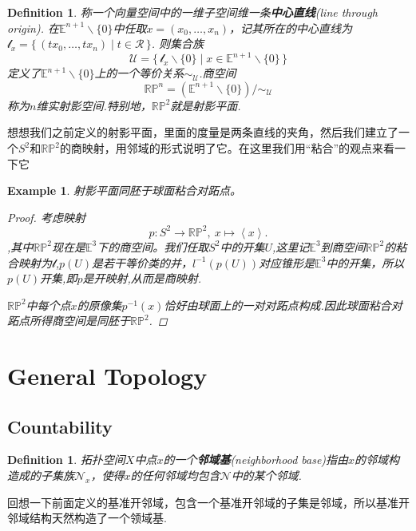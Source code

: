 \documentclass{article}
\newtheorem{example}[theorem]{Example}
\newtheorem{definition}[theorem]{Definition}
\newcommand*{\xfunc}[4]{{#2}\colon{#3}{#1}{#4}}
\newcommand*{\func}[3]{\xfunc{\to}{#1}{#2}{#3}}
\newcommand\Set[2]{\{\,#1\mid#2\,\}} %
\begin{document}
\begin{definition}
称一个向量空间中的一维子空间维一条\textbf{中心直线}(line through origin). 在$\mathbb{E}^{n+1} \smallsetminus \{0\}$中任取$x=(x_0,\ldots,x_n)$，记其所在的中心直线为$\mathcal{l}_x=\Set{(tx_0,\ldots,tx_n)}{t \in \mathcal{R}}$. 则集合族\[\mathcal{U} = \Set{\mathcal{l}_x \smallsetminus \{0\} }{x \in \mathbb{E}^{n+1} \smallsetminus \{0\}}\]定义了$\mathbb{E}^{n+1} \smallsetminus \{0\}$上的一个等价关系$\sim_{\mathcal{U}}$.商空间\[\mathbb{R}\mathbb{P}^n=(\mathbb{E}^{n+1} \smallsetminus \{0\}) / \sim_{\mathcal{U}}\]称为$n$维实射影空间.特别地，$\mathbb{R}\mathbb{P}^2$就是射影平面.
\end{definition}

想想我们之前定义的射影平面，里面的度量是两条直线的夹角，然后我们建立了一个$S^2$和$\mathbb{R}\mathbb{P}^2$的商映射，用邻域的形式说明了它。在这里我们用“粘合”的观点来看一下它

\begin{example}
射影平面同胚于球面粘合对跖点。
\begin{proof}
考虑映射\[\func{p}{S^2}{\mathbb{R}\mathbb{P}^2},\ x \mapsto \left< x \right>.\],其中$\mathbb{R}\mathbb{P}^2$现在是$\mathbb{E}^3$下的商空间。我们任取$S^2$中的开集$U$,这里记$\mathbb{E}^3$到商空间$\mathbb{R}\mathbb{P}^2$的粘合映射为$\mathcal{l}$,$p(U)$是若干等价类的并，$l^{-1}(p(U))$对应锥形是$\mathbb{E}^3$中的开集，所以$p(U)$开集,即$p$是开映射,从而是商映射.

$\mathbb{R}\mathbb{P}^2$中每个点$x$的原像集$p^{-1}(x)$恰好由球面上的一对对跖点构成.因此球面粘合对跖点所得商空间是同胚于$\mathbb{R}\mathbb{P}^2$.
\end{proof}
\end{example}

\newpage

\section{General Topology}
\subsection{Countability}

\begin{definition}
拓扑空间$X$中点$x$的一个\textbf{邻域基}(neighborhood base)指由$x$的邻域构造成的子集族$\mathcal{N}_x$，使得$x$的任何邻域均包含$\mathcal{N}$中的某个邻域.
\end{definition}

回想一下前面定义的基准开邻域，包含一个基准开邻域的子集是邻域，所以基准开邻域结构天然构造了一个领域基.
\end{document}
